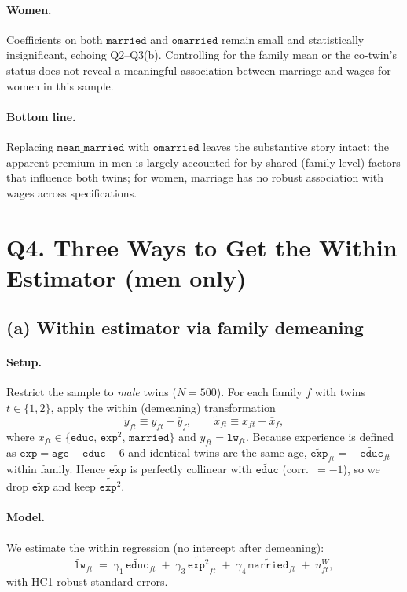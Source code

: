 \documentclass[12pt]{article}
\begin{document}
\paragraph{Women.}
Coefficients on both \(\texttt{married}\) and \(\texttt{omarried}\) remain small and statistically insignificant, echoing Q2–Q3(b). Controlling for the family mean or the co-twin’s status does not reveal a meaningful association between marriage and wages for women in this sample.

\paragraph{Bottom line.}
Replacing \(\texttt{mean\_married}\) with \(\texttt{omarried}\) leaves the substantive story intact: the apparent premium in men is largely accounted for by shared (family-level) factors that influence both twins; for women, marriage has no robust association with wages across specifications.

\section*{Q4. Three Ways to Get the Within Estimator (men only)}

\subsection*{(a) Within estimator via family demeaning}

\paragraph{Setup.}
Restrict the sample to \emph{male} twins ($N=500$). For each family $f$ with twins $t\in\{1,2\}$,
apply the within (demeaning) transformation
\[
  \tilde y_{ft} \equiv y_{ft}-\bar y_f, \qquad
  \tilde x_{ft} \equiv x_{ft}-\bar x_f ,
\]
where $x_{ft}\in\{\texttt{educ},\,\texttt{exp}^2,\,\texttt{married}\}$ and $y_{ft}=\texttt{lw}_{ft}$.
Because experience is defined as $\texttt{exp}=\texttt{age}-\texttt{educ}-6$ and identical twins are the
same age, $\widetilde{\texttt{exp}}_{ft} = -\,\widetilde{\texttt{educ}}_{ft}$ within family. Hence
$\tilde{\texttt{exp}}$ is perfectly collinear with $\tilde{\texttt{educ}}$ (corr.\ $=-1$), so we drop
$\tilde{\texttt{exp}}$ and keep $\widetilde{\texttt{exp}^2}$.

\paragraph{Model.}
We estimate the within regression (no intercept after demeaning):
\[
  \tilde{\texttt{lw}}_{ft}
  \;=\;
  \gamma_1\,\tilde{\texttt{educ}}_{ft}
  \;+\;
  \gamma_3\,\widetilde{\texttt{exp}^2}_{ft}
  \;+\;
  \gamma_4\,\tilde{\texttt{married}}_{ft}
  \;+\; u^{W}_{ft},
\]
with HC1 robust standard errors.
\end{document}
